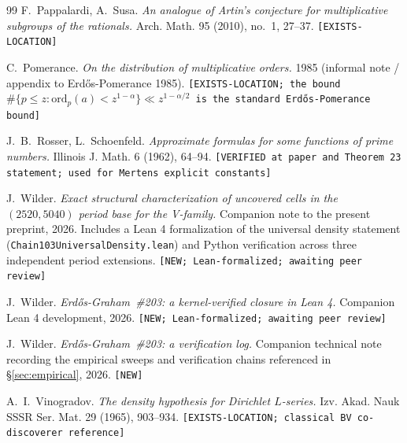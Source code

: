 \documentclass[11pt,a4paper]{article}
\theoremstyle{plain}
\theoremstyle{definition}
\theoremstyle{remark}
\begin{document}
\begin{thebibliography}{99}
F.~Pappalardi, A.~Susa.
\emph{An analogue of Artin's conjecture for multiplicative subgroups
of the rationals.}
Arch. Math. 95 (2010), no.~1, 27--37.
\texttt{[EXISTS-LOCATION]}

C.~Pomerance.
\emph{On the distribution of multiplicative orders.}
1985 (informal note / appendix to Erd\H{o}s-Pomerance 1985).
\texttt{[EXISTS-LOCATION; the bound $\#\{p \leq z : \mathrm{ord}_{p}(a)
< z^{1-\alpha}\} \ll z^{1 - \alpha/2}$ is the standard
Erd\H{o}s-Pomerance bound]}

J.~B.~Rosser, L.~Schoenfeld.
\emph{Approximate formulas for some functions of prime numbers.}
Illinois J. Math. 6 (1962), 64--94.
\texttt{[VERIFIED at paper and Theorem 23 statement; used for Mertens
explicit constants]}

J.~Wilder.
\emph{Exact structural characterization of uncovered cells in the
$(2520, 5040)$ period base for the V-family.}
Companion note to the present preprint, 2026. Includes a Lean 4
formalization of the universal density statement
(\texttt{Chain103UniversalDensity.lean}) and Python verification
across three independent period extensions.
\texttt{[NEW; Lean-formalized; awaiting peer review]}

J.~Wilder.
\emph{Erd\H{o}s-Graham~\#203: a kernel-verified closure in Lean 4.}
Companion Lean 4 development, 2026.
\texttt{[NEW; Lean-formalized; awaiting peer review]}

J.~Wilder.
\emph{Erd\H{o}s-Graham~\#203: a verification log.}
Companion technical note recording the empirical sweeps and
verification chains referenced in \S\ref{sec:empirical}, 2026.
\texttt{[NEW]}

A.~I.~Vinogradov.
\emph{The density hypothesis for Dirichlet $L$-series.}
Izv. Akad. Nauk SSSR Ser. Mat. 29 (1965), 903--934.
\texttt{[EXISTS-LOCATION; classical BV co-discoverer reference]}

\end{thebibliography}
\end{document}
